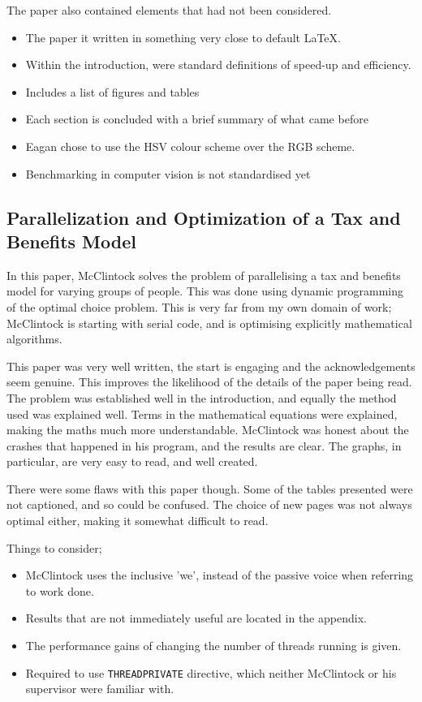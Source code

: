 \documentclass[../main.tex]{subfiles}
\begin{document}
    The paper also contained elements that had not been considered.
    \begin{itemize}
      \item The paper it written in something very close to default \LaTeX.
      \item Within the introduction, were standard definitions of speed-up and efficiency.
      \item Includes a list of figures and tables
      \item Each section is concluded with a brief summary of what came before
      \item Eagan chose to use the HSV colour scheme over the RGB scheme.
      \item Benchmarking in computer vision is not standardised yet
    \end{itemize}
  \subsection{Parallelization and Optimization of a Tax and Benefits Model}
    In this paper, McClintock solves the problem of parallelising a tax and benefits model for varying groups of people.
    This was done using dynamic programming of the optimal choice problem.
    This is very far from my own domain of work; McClintock is starting with serial code, and is optimising explicitly mathematical algorithms.

    This paper was very well written, the start is engaging and the acknowledgements seem genuine.
    This improves the likelihood of the details of the paper being read.
    The problem was established well in the introduction, and equally the method used was explained well.
    Terms in the mathematical equations were explained, making the maths much more understandable.
    McClintock was honest about the crashes that happened in his program, and the results are clear.
    The graphs, in particular, are very easy to read, and well created.

    There were some flaws with this paper though.
    Some of the tables presented were not captioned, and so could be confused.
    The choice of new pages was not always optimal either, making it somewhat difficult to read.

    Things to consider;
    \begin{itemize}
      \item McClintock uses the inclusive 'we', instead of the passive voice when referring to work done.
      \item Results that are not immediately useful are located in the appendix.
      \item The performance gains of changing the number of threads running is given.
      \item Required to use \texttt{THREADPRIVATE} directive, which neither McClintock or his supervisor were familiar with.
    \end{itemize} 
\end{document}
